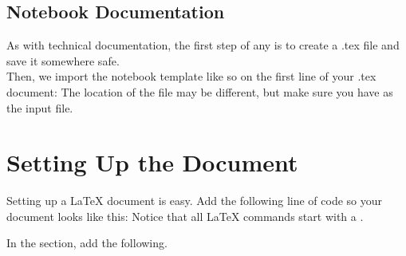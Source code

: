\subsection{Notebook Documentation}
As with technical documentation, the first step of any is to create a .tex file and save it somewhere safe.\\
Then, we import the notebook template like so on the first line of your .tex document:  The location of the file may be different, but make sure you have  as the input file.

\section{Setting Up the Document}
Setting up a \LaTeX{} document is easy.  Add the following line of code so your document looks like this:   Notice that all \LaTeX{} commands start with a \code{\sla}.\newpage

In the  section, add the following.



